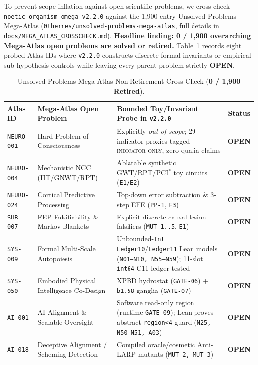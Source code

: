 \documentclass[11pt,reqno]{amsart}
\theoremstyle{remark}
\newcommand{\tagIO}{\textsc{indicator-only}}
\begin{document}
To prevent scope inflation against open scientific problems, we cross-check \texttt{noetic-\allowbreak organism-\allowbreak omega v2.2.0} against the 1,900-entry Unsolved Problems Mega-Atlas (\texttt{0thernes/\allowbreak unsolved-\allowbreak problems-\allowbreak mega-\allowbreak atlas}, full details in \texttt{docs/\allowbreak MEGA\_\allowbreak ATLAS\_\allowbreak CROSSCHECK.md}). \textbf{Headline finding: 0 / 1,900 overarching Mega-Atlas open problems are solved or retired.} Table~\ref{tab:atlas} records eight probed Atlas IDs where \texttt{v2.2.0} constructs discrete formal invariants or empirical sub-hypothesis controls while leaving every parent problem strictly \textbf{OPEN}.

\begin{table}[ht]
\centering
\caption{Unsolved Problems Mega-Atlas Non-Retirement Cross-Check (\textbf{0 / 1,900 Retired}).}
\label{tab:atlas}
\footnotesize
\setlength{\tabcolsep}{3.5pt}
\begin{tabular}{@{} l >{\raggedright\arraybackslash}p{4.5cm} >{\raggedright\arraybackslash}p{5.6cm} c @{}}
\toprule
\textbf{Atlas ID} & \textbf{Mega-Atlas Open Problem} & \textbf{Bounded Toy/Invariant Probe in \texttt{v2.2.0}} & \textbf{Status} \\
\midrule
\texttt{NEURO-001} & Hard Problem of Consciousness & Explicitly \emph{out of scope}; 29 indicator proxies tagged \tagIO{}, zero qualia claims & \textbf{OPEN} \\
\texttt{NEURO-004} & Mechanistic NCC (IIT/GNWT/RPT) & Ablatable synthetic GWT/RPT/PCI$^*$ toy circuits (\texttt{E1/E2}) & \textbf{OPEN} \\
\texttt{NEURO-024} & Cortical Predictive Processing & Top-down error subtraction \& 3-step EFE (\texttt{PP-1}, \texttt{F3}) & \textbf{OPEN} \\
\texttt{SUB-007} & FEP Falsifiability \& Markov Blankets & Explicit discrete causal lesion falsifiers (\texttt{MUT-1..5}, \texttt{E1}) & \textbf{OPEN} \\
\texttt{SYS-009} & Formal Multi-Scale Autopoiesis & Unbounded-\texttt{Int} \texttt{Ledger10}/\texttt{Ledger11} Lean models (\texttt{N01--N10, N55--N59}); 11-slot \texttt{int64} C11 ledger tested & \textbf{OPEN} \\
\texttt{SYS-050} & Embodied Physical Intelligence Co-Design & XPBD hydrostat (\texttt{GATE-06}) + \texttt{b1.58} ganglia (\texttt{GATE-07}) & \textbf{OPEN} \\
\texttt{AI-001} & AI Alignment \& Scalable Oversight & Software read-only region (runtime \texttt{GATE-09}); Lean proves abstract \texttt{region<4} guard (\texttt{N25, N50--N51, A03}) & \textbf{OPEN} \\
\texttt{AI-018} & Deceptive Alignment / Scheming Detection & Compiled oracle/cosmetic Anti-LARP mutants (\texttt{MUT-2, MUT-3}) & \textbf{OPEN} \\
\bottomrule
\end{tabular}
\end{table}
\end{document}
